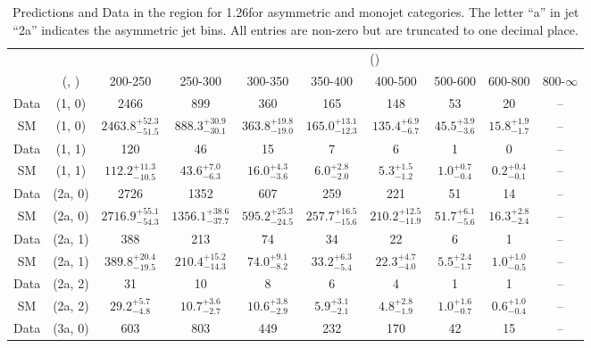 \begin{table}[h!]
\tiny
\centering
\caption{Predictions and Data in the \mj region for 1.26\ifb for asymmetric and monojet categories. The letter ``a'' in jet \eg ``2a''  indicates the asymmetric jet bins. All entries are non-zero but are truncated to one decimal place.\label{tab:predall_mu_comb_asym}}
\begin{tabular}
{cccccccccc}
	\hline\hline
&	&	& \multicolumn{8}{c}{\scalht (\gev)}\\ 
	&	 (\njet, \nb) & 200-250 & 250-300 & 300-350 & 350-400 & 400-500 & 500-600 & 600-800 & 800-$\infty$ \\ [0.8ex] 
\hline
	Data & (1, 0) & 2466 & 899 & 360 & 165 & 148 & 53 & 20 & -- \\[0.5ex] 
	SM & (1, 0) & $2463.8^{+ 52.3 }_{- 51.5 }$ & $888.3^{+ 30.9 }_{- 30.1 }$ & $363.8^{+ 19.8 }_{- 19.0 }$ & $165.0^{+ 13.1 }_{- 12.3 }$ & $135.4^{+ 6.9 }_{- 6.7 }$ & $45.5^{+ 3.9 }_{- 3.6 }$ & $15.8^{+ 1.9 }_{- 1.7 }$ & -- \\[0.5ex] 
	Data & (1, 1) & 120 & 46 & 15 & 7 & 6 & 1 & 0 & -- \\[0.5ex] 
	SM & (1, 1) & $112.2^{+ 11.3 }_{- 10.5 }$ & $43.6^{+ 7.0 }_{- 6.3 }$ & $16.0^{+ 4.3 }_{- 3.6 }$ & $6.0^{+ 2.8 }_{- 2.0 }$ & $5.3^{+ 1.5 }_{- 1.2 }$ & $1.0^{+ 0.7 }_{- 0.4 }$ & $0.2^{+ 0.4 }_{- 0.1 }$ & -- \\[0.5ex] 
	Data & (2a, 0) & 2726 & 1352 & 607 & 259 & 221 & 51 & 14 & -- \\[0.5ex] 
	SM & (2a, 0) & $2716.9^{+ 55.1 }_{- 54.3 }$ & $1356.1^{+ 38.6 }_{- 37.7 }$ & $595.2^{+ 25.3 }_{- 24.5 }$ & $257.7^{+ 16.5 }_{- 15.6 }$ & $210.2^{+ 12.5 }_{- 11.9 }$ & $51.7^{+ 6.1 }_{- 5.6 }$ & $16.3^{+ 2.8 }_{- 2.4 }$ & -- \\[0.5ex] 
	Data & (2a, 1) & 388 & 213 & 74 & 34 & 22 & 6 & 1 & -- \\[0.5ex] 
	SM & (2a, 1) & $389.8^{+ 20.4 }_{- 19.5 }$ & $210.4^{+ 15.2 }_{- 14.3 }$ & $74.0^{+ 9.1 }_{- 8.2 }$ & $33.2^{+ 6.3 }_{- 5.4 }$ & $22.3^{+ 4.7 }_{- 4.0 }$ & $5.5^{+ 2.4 }_{- 1.7 }$ & $1.0^{+ 1.0 }_{- 0.5 }$ & -- \\[0.5ex] 
	Data & (2a, 2) & 31 & 10 & 8 & 6 & 4 & 1 & 1 & -- \\[0.5ex] 
	SM & (2a, 2) & $29.2^{+ 5.7 }_{- 4.8 }$ & $10.7^{+ 3.6 }_{- 2.7 }$ & $10.6^{+ 3.8 }_{- 2.9 }$ & $5.9^{+ 3.1 }_{- 2.1 }$ & $4.8^{+ 2.8 }_{- 1.9 }$ & $1.0^{+ 1.6 }_{- 0.7 }$ & $0.6^{+ 1.0 }_{- 0.4 }$ & -- \\[0.5ex] 
	Data & (3a, 0) & 603 & 803 & 449 & 232 & 170 & 42 & 15 & -- \\[0.5ex] 

\end{tabular}
\end{table}

